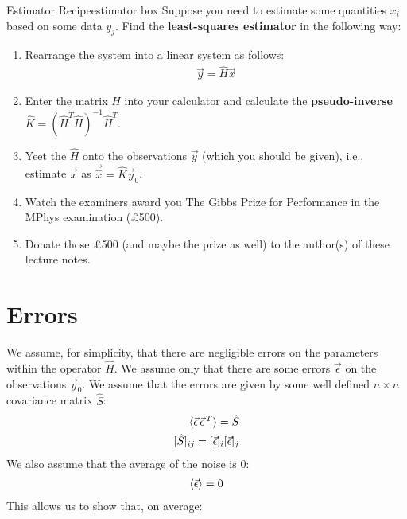\begin{fact}{Estimator Recipe}{estimator box}\label{estimator box}
    Suppose you need to estimate some quantities $x_i$ based on some data $y_j$. Find the \textbf{least-squares estimator} in the following way:
    \begin{enumerate}
        \item Rearrange the system into a linear system as follows:
    \begin{align*}
        \vec{y}=\hat{H}\vec{x}
    \end{align*}
        \item Enter the matrix $\hat{H}$ into your calculator and calculate the \textbf{pseudo-inverse} $\hat{K}= (\hat{H}^T\hat{H})^{-1}\hat{H}^T$. 
        \item Yeet the $\hat{H}$ onto the observations $\vec{y}$ (which you should be given), i.e., estimate $\vec{x}$ as $\vec{\hat{x}}=\hat{K}\vec{y}_0$.
        \item Watch the examiners award you The Gibbs Prize for Performance in the MPhys examination (£500).
        \item Donate those £500 (and maybe the prize as well) to the author(s) of these lecture notes.
    \end{enumerate}
\end{fact}

\section{Errors}

We assume, for simplicity, that there are negligible errors on the parameters within the operator $\hat{H}$. We assume only that there are some errors $\vec{\epsilon}$ on the observations $\vec{y}_0$. We assume that the errors are given by some well defined $n\times n$ covariance matrix $\hat{S}$:
\begin{align*}
    \braket{\vec{\epsilon}\,\vec{\epsilon}\,^T}=\hat{S}\\
    [\hat{S}]_{ij}=[\vec{\epsilon}]_i[\vec{\epsilon}]_j
\end{align*}
We also assume that the average of the noise is $0$:
\begin{align*}
    \braket{\vec{\epsilon}}=0
\end{align*}
This allows us to show that, on average:

